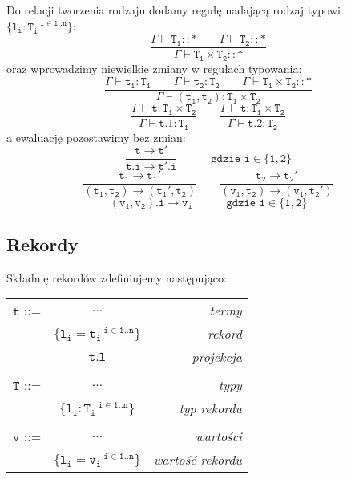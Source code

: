 \documentclass[11pt,leqno]{article}
\begin{document}
Do relacji tworzenia rodzaju dodamy regułę nadającą rodzaj typowi $\mathtt{\{l_i:T_i^{\;\;\;i \in 1..n}\}}$:~\[\mathtt{
             \frac{\Gamma \vdash T_1::\ast \hspace{2em} \Gamma \vdash T_2::\ast}{\Gamma \vdash T_1\times T_2::\ast}
		}
	\]
oraz wprowadzimy niewielkie zmiany w regułach typowania:~\[\mathtt{
             \frac{\Gamma \vdash t_1:T_1 \hspace{2em} \Gamma \vdash t_2:T_2 \hspace{2em}\Gamma \vdash T_1\times T_2::\ast}{\Gamma \vdash (t_1,t_2):T_1\times T_2}
            }
	\]
 	\[\mathtt{
           \frac{\Gamma \vdash t : T_1\times T_2}{\Gamma \vdash t.1 : T_1} 
           \qquad
           \frac{\Gamma \vdash t : T_1\times T_2}{\Gamma \vdash t.2 : T_2} 
            }
	\]
a ewaluację pozostawimy bez zmian: \\
 	\[\mathtt{
                \frac{t \longrightarrow t'}{t.i \longrightarrow t'.i} \hspace{3em} \text{gdzie } i\in\{1,2\}
		}
	\]
 	\[\mathtt{
                \frac{t_1 \longrightarrow t_1'}{(t_1,t_2) \longrightarrow (t_1',t_2)} 
                \qquad
                \frac{t_2 \longrightarrow t_2'}{(v_1,t_2) \longrightarrow (v_1,t_2')} 
		}
	\]
 	\[\mathtt{
                (v_1,v_2).i \longrightarrow v_i \hspace{3em} \text{gdzie } i\in\{1,2\}
		}
	\]

\subsection{Rekordy}

Składnię rekordów zdefiniujemy następująco:\\

\begin{tabular}{| l c r |}
  \hline
  $\mathtt{t}$ ::= & $\dots$ & \textit{termy}  \\
   & $\mathtt{\{l_i=t_i^{\;\;\;i \in 1..n}\}}$ & \textit{rekord} \\
   & $\mathtt{t.l}$ & \textit{projekcja} \\ 
   & & \\
  $\mathtt{T}$ ::= & $\dots$ & \textit{typy}  \\
   & $\mathtt{\{l_i:T_i^{\;\;\;i \in 1..n}\}}$ & \textit{typ rekordu} \\
   & & \\
  $\mathtt{v}$ ::= & $\dots$ & \textit{wartości}  \\
   & $\mathtt{\{l_i=v_i^{\;\;\;i \in 1..n}\}}$ & \textit{wartość rekordu} \\
  \hline
\end{tabular} \\
\end{document}
